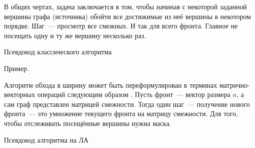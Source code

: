 В общих чертах, задача заключается в том, чтобы начиная с некоторой заданной вершины графа (источника) обойти все достижимые из неё вершины в некотором порядке.
Шаг~--- просмотр все смежных.
И так для всего фронта.
Главное не посещать одну и ту же вершину несколько раз.

Псевдокод классического алгоритма

Пример.

Алгоритм обхода в ширину может быть переформулирован в терминах матрично-векторных операций следующим образом%
.
Пусть фронт~--- вектор размера $n$, а сам граф представлен матрицей смежности.
Тогда один шаг~--- получение нового фронта~--- это умножение текущего фронта на матрицу смежности.
Для того, чтобы отслеживать посещённые вершины нужна маска.

Псевдокод алгоритма на ЛА

